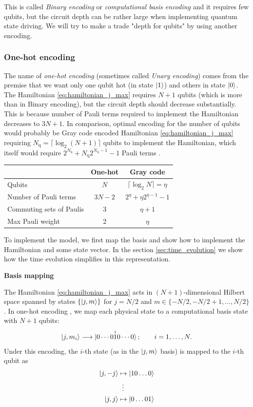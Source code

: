 \documentclass[%
nofootinbib,
 amsmath,amssymb,
 aps,
 prd,
10pt]{revtex4-2}
\begin{document}
This is called \emph{Binary encoding} or \emph{computational basis encoding} and it requires few qubits, but the circuit depth can be rather large when implementing quantum state driving. We will try to make a trade "depth for qubits" by using another encoding.


\subsubsection{One-hot encoding}
The name of \emph{one-hot encoding} (sometimes called \emph{Unary encoding}) comes from the premise that we want only one qubit hot (in state $\ket{1}$) and others in state $\ket{0}$. The Hamiltonian \ref{eq:hamiltonian_j_max} requires $N+1$ qubits (which is more than in Binary encoding), but the circuit depth should decrease substantially. This is because number of Pauli terms required to implement the Hamiltonian decreases to $3N+1$. In comparison, optimal encoding for the number of qubits would probably be Gray code encoded Hamiltonian \ref{eq:hamiltonian_j_max} requiring $N_\mathrm q = \lceil \log_2(N+1)\rceil$ qubits to implement the Hamiltonian, which itself would require $2^{N_\mathrm q}+N_\mathrm q 2^{N_\mathrm q-1}-1$ Pauli terms \cite{Matteo21}.

\begin{fcitation}{\cite{Matteo21}}
{}\centering
\begin{tabular}{lcc}
\hline\hline
& \textbf{One-hot} & \textbf{Gray code} \\
\hline
Qubits & $N$ & $\lceil \log_2 N \rceil = \eta$ \\
Number of Pauli terms & $3N-2$ & $2^\eta + \eta 2^{\eta-1} - 1$ \\
Commuting sets of Paulis & 3 & $\eta + 1$ \\
Max Pauli weight & 2 & $\eta$ \\
\hline\hline
\end{tabular}
\end{fcitation}

To implement the model, we first map the basis and show how to implement the Hamiltonian and some state vector. In the section \ref{sec:time_evolution} we show how the time evolution simplifies in this representation.

\textbf{Basis mapping}

The Hamiltonian \ref{eq:hamiltonian_j_max} acts in $(N+1)$-dimensional Hilbert space spanned by states $\{\ket{j,m}\}$ for $j=N/2$ and $m \in \{-N/2, -N/2+1, \ldots, N/2\}$. In one-hot encoding \cite{Sawaya20,Matteo21}, we map each physical state to a computational basis state with $N+1$ qubits:
\begin{equation}
    \ket{j,m_i} \longrightarrow \ket{0\cdots 0 \overset{i}{1} 0 \cdots 0};\qquad i=1,\dots,N.
\end{equation}
Under this encoding, the $i$-th state (as in the $\ket{j,m}$ basis) is mapped to the $i$-th qubit as
\begin{align*}
    \ket{j,-j} &\mapsto \ket{10\dots 0}\\
    &\;\;\vdots\\
    \ket{j,j} &\mapsto \ket{0\dots 01}
\end{align*}
\end{document}
